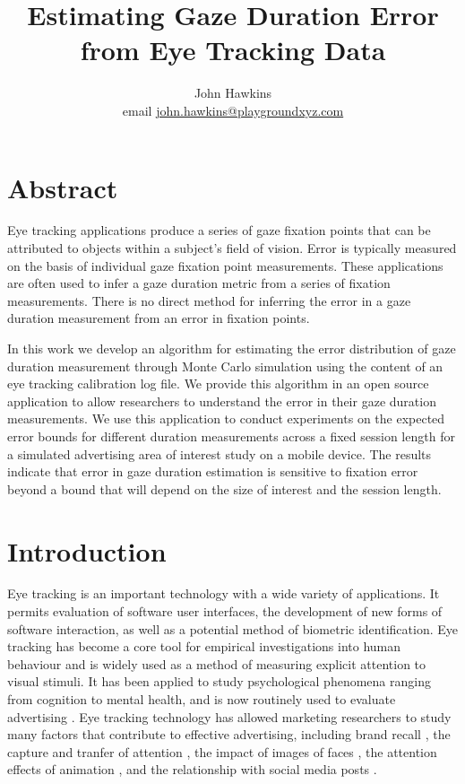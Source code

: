 \documentclass[12pt,a4paper]{article}
\numberwithin{equation}{section}
\begin{document}
 
\title{Estimating Gaze Duration Error from Eye Tracking Data}

\author{
John Hawkins \\ email \href{mailto:john.hawkins@playgroundxyz.com}{john.hawkins@playgroundxyz.com} \\
} 

\maketitle

\section{Abstract}

Eye tracking applications produce a series of gaze fixation points that can be attributed to
objects within a subject's field of vision. Error is typically measured on the basis of individual
gaze fixation point measurements. These applications are often used to infer a gaze duration
metric from a series of fixation measurements. There is no direct method for inferring the error in
a gaze duration measurement from an error in fixation points. 

In this work we develop an algorithm for estimating
the error distribution of gaze duration measurement through Monte Carlo simulation 
using the content of an eye tracking calibration log file. 
We provide this algorithm in an open source application
to allow researchers to understand the error in their gaze duration measurements. 
We use this application to conduct experiments on the expected error bounds for different duration
measurements across a fixed session length for a simulated advertising area of interest 
study on a mobile device. 
The results indicate that error in gaze duration estimation is sensitive to
fixation error beyond a bound that will depend on the size of interest and the session length.


\section{Introduction}

Eye tracking is an important technology with a wide variety of applications. It permits evaluation
of software user interfaces\cite{Harezlak2015}, the development of new forms of software interaction, as well as a potential method of biometric identification\cite{Kasprowski2018}. 
Eye tracking has become a core tool for empirical investigations 
into human behaviour and is widely used as a method of measuring explicit attention to visual stimuli. 
It has been applied to study psychological phenomena ranging from cognition\cite{Brunye2019}
to mental health\cite{Duque2014,Rudich-Strassler2022}, and is now routinely used to evaluate 
advertising \cite{Hervet2011}. Eye tracking technology has allowed marketing researchers 
to study many factors that contribute to effective advertising, 
including brand recall \cite{Wedel2000},
the capture and tranfer of attention \cite{Pieters2004}, 
the impact of images of faces \cite{Djamasbi2010},
the attention effects of animation \cite{Hamborg2012},
and the relationship with social media posts \cite{Barreto2013}.
\end{document}
